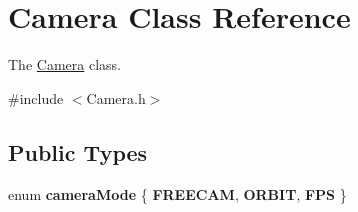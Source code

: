 \hypertarget{class_camera}{\section{Camera Class Reference}
\label{class_camera}
}


The \hyperlink{class_camera}{Camera} class.  




{\ttfamily \#include $<$Camera.\-h$>$}

\subsection*{Public Types}
\begin{DoxyCompactItemize}
\item 
enum {\bfseries camera\-Mode} \{ {\bfseries F\-R\-E\-E\-C\-A\-M}, 
{\bfseries O\-R\-B\-I\-T}, 
{\bfseries F\-P\-S}
 \}
\end{DoxyCompactItemize}
